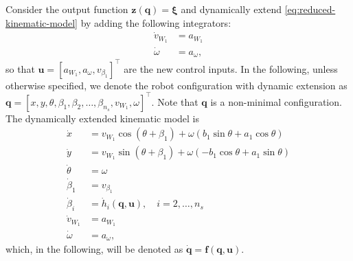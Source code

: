 Consider the output function $\bm{z}(\bm{q})=\bm{\xi}$ and dynamically extend
\eqref{eq:reduced-kinematic-model} by adding the following integrators:
\begin{subequations}
    \begin{align*}
        \dot{v}_{W_1} &= a_{W_1} \\
        \dot{\omega} &= a_{\omega},
    \end{align*}
\end{subequations}
so that $\bm{u} = \left[ a_{W_1}, a_{\omega}, v_{\beta_1} \right]^\top $ are
the new control inputs. In the following, unless otherwise specified, we denote
the robot configuration with dynamic extension as
$\bm{q} = [x, y, \theta, \beta_1, \beta_2, \dots, \beta_{n_s}, v_{W_1}, \omega]^\top$.
Note that $\bm{q}$ is a non-minimal configuration.
The dynamically extended kinematic model is
\begin{equation}
\label{eq:dynamically-extended-kinematic-model}
\begin{split}
    \dot{x} &= v_{W_1} \cos(\theta + \beta_1) + \omega (b_1 \sin\theta + a_1 \cos\theta) \\
    \dot{y} &= v_{W_1} \sin(\theta + \beta_1) + \omega (-b_1 \cos\theta + a_1 \sin\theta) \\
    \dot{\theta} &= \omega \\
    \dot{\beta}_1 &= v_{\beta_1} \\
    \dot{\beta}_i &= \dot{h}_i(\bm{q}, \bm{u}), \quad i = 2, \dots, n_s \\
    \dot{v}_{W_1} &= a_{{W_1}} \\
    \dot{\omega} &= a_{\omega},
\end{split}
\end{equation}
which, in the following, will be denoted as $\dot{\bm{q}} = \bm{f}(\bm{q}, \bm{u})$.

